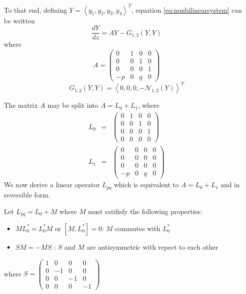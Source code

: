 To that end, defining  $Y=\left<y_1,y_2,y_3,y_4\right>^T$, equation 
\eqref{eq:nonbilinearsystem} can be written
\begin{equation}\label{eq:matrixeq1}
 \frac{ dY }{ dz } = A Y - G_{1,2}(Y,Y)
\end{equation}
where 
\begin{equation}\label{eq:nonlinear}
A = \left(\begin{array}{cccc}0&1&0&0\\0&0&1&0\\0&0&0&1\\-p&0&q&0\end{array}\right) 
\end{equation}
\begin{equation}\label{eq:nonlinear}
G_{1,2}(Y,Y) = \left<0,0,0,-\mathcal{N}_{1,2}\left(Y\right)\right>^T
\end{equation}

The matrix $A$ may be split into $A = L_0 + L_1 $, where 
\begin{subequations}
\begin{eqnarray}
L_0 &=& \left(\begin{array}{cccc}0&1&0&0\\0&0&1&0\\0&0&0&1\\0&0&0&0\end{array}\right) \\
L_1 &=& \left(\begin{array}{cccc}0&0&0&0\\0&0&0&0\\0&0&0&0\\-p&0&q&0\end{array}\right) 
\end{eqnarray}
\end{subequations}
We now derive a linear operator $L_{pq}$ which is equivalent to $A=L_0+L_1$ and in reversible form.

Let $L_{pq} = L_0 + M $ where $M$ must satifisfy the following properties:

\begin{itemize}
\item $ M L_0^* = L_0^* M $ or $ \left[M, L_0^*\right]=0$: $M$ commutes with $L_0^*$
\item $ S M  = -M S $ : $S$ and $M$ are antisymmetric with repect to each other
\end{itemize}
where $S = \left(\begin{array}{cccc}1&0&0&0\\0&-1&0&0\\0&0&-1&0\\0&0&0&-1\end{array}\right) $


